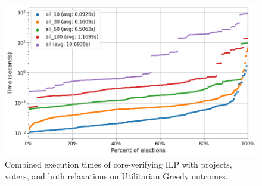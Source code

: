 \documentclass[magisterska,en]{pracamgr}
\newcommand\chartsize{0.94}
\begin{document}
\begin{figure}[h!]
    \centering
    \includegraphics[width=\chartsize\linewidth]{outputs/Relaxations/greedy.png}
    \caption{Combined execution times of core-verifying ILP with projects, voters, and both relaxations on Utilitarian Greedy outcomes.}
    \label{relaxations-greedy-time}
\end{figure}
\end{document}
